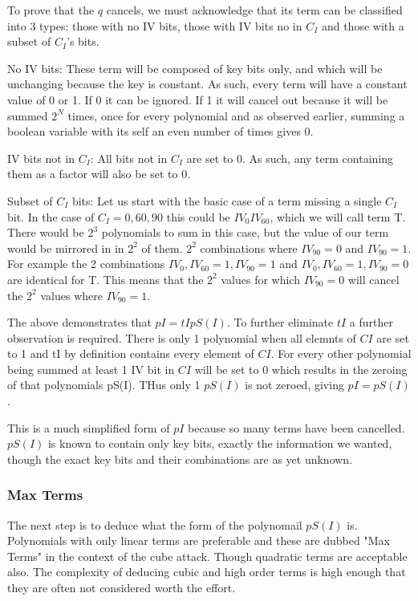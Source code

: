 \documentclass{report}
\let\Oldsubsubsection\subsubsection
\renewcommand{\subsubsection}{\FloatBarrier\Oldsubsubsection}
\begin{document}
To prove that the $q$ cancels, we must acknowledge that its term can be classified into 3 types: those with no IV bits, those with IV bits no in $C_I$ and those with a subset of $C_I$'s bits.

No IV bits:
These term will be composed of key bits only, and which will be unchanging because the key is constant. As such, every term will have a constant value of 0 or 1. If 0 it can be ignored. If 1 it will cancel out because it will be summed $2^N$ times, once for every polynomial and as observed earlier, summing a boolean variable with its self an even number of times gives 0.

IV bits not in $C_I$:
All bits not in $C_I$ are set to 0. As such, any term containing them as a factor will also be set to 0.

Subset of $C_I$ bits:
Let us start with the basic case of a term missing a single $C_I$ bit. In the case of $C_I={0, 60, 90}$ this could be $IV_0IV_{60}$, which we will call term T. There would be $2^3$ polynomials to sum in this case, but the value of our term would be mirrored in in $2^2$ of them. $2^2$ combinations where $IV_{90}=0$ and $IV_{90}=1$. For example the 2 combinations $IV_0, IV_{60}=1, IV_{90}=1$ and $IV_0, IV_{60}=1, IV_{90}=0$ are identical for T. This means that the $2^2$ values for which $IV_{90}=0$ will cancel the $2^2$ values where $IV_{90}=1$.

The above demonstrates that $pI=tIpS(I)$. To further eliminate $tI$ a further observation is required. There is only 1 polynomial when all elemnts of $CI$ are set to 1 and tI by definition contains every element of $CI$. For every other polynomial being summed at least 1 IV bit in $CI$ will be set to 0 which results in the zeroing of that polynomials pS(I). THus only 1 $pS(I)$ is not zeroed, giving $pI=pS(I)$.

This is a much simplified form of $pI$ because so many terms have been cancelled. $pS(I)$ is known to contain only key bits, exactly the information we wanted, though the exact key bits and their combinations are as yet unknown.

\subsubsection{Max Terms}
The next step is to deduce what the form of the polynomail $pS(I)$ is. Polynomials with only linear terms are preferable and these are dubbed "Max Terms" in the context of the cube attack. Though quadratic terms are acceptable also. The complexity of deducing cubic and high order terms is high enough that they are often not considered worth the effort.%
\end{document}

